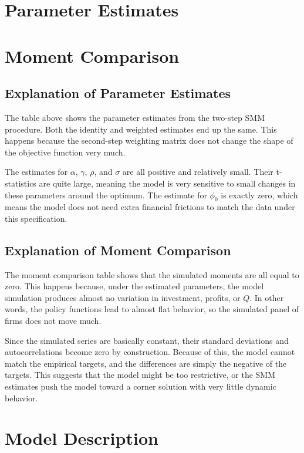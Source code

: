 \documentclass[12pt]{article}
\begin{document}
\section{Parameter Estimates}


\section{Moment Comparison}



\subsection*{Explanation of Parameter Estimates}
The table above shows the parameter estimates from the two-step SMM procedure. 
Both the identity and weighted estimates end up 
the same. This happens because the second-step weighting matrix does not change 
the shape of the objective function very much.

The estimates for $\alpha$, $\gamma$, $\rho$, and $\sigma$ are all positive and 
relatively small. Their t-statistics are quite large, meaning the model is very 
sensitive to small changes in these parameters around the optimum. The estimate 
for $\phi_0$ is exactly zero, which means the model does not need extra financial 
frictions to match the data under this specification.

\subsection*{Explanation of Moment Comparison}
The moment comparison table shows that the simulated moments are all equal to 
zero. This happens because, under the estimated parameters, the model simulation 
produces almost no variation in investment, profits, or $Q$. In other words, the 
policy functions lead to almost flat behavior, so the simulated panel of firms 
does not move much.

Since the simulated series are basically constant, their standard deviations and 
autocorrelations become zero by construction. Because of this, the model cannot 
match the empirical targets, and the differences are simply the negative of the 
targets. This suggests that the model might be too restrictive, or the SMM 
estimates push the model toward a corner solution with very little dynamic 
behavior.

\section*{Model Description}
\end{document}

